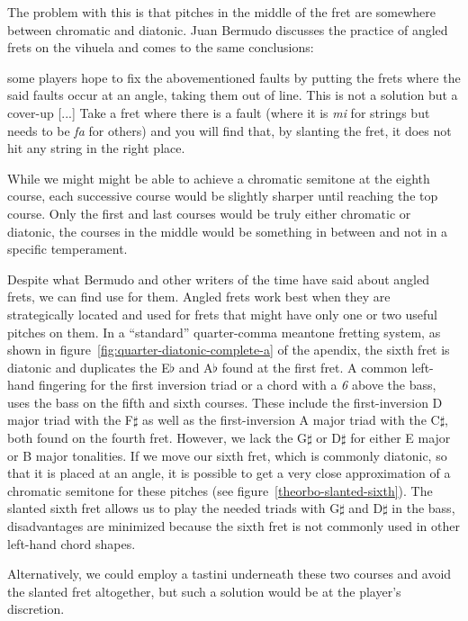 The problem with this is that pitches in the middle of the fret are somewhere between
chromatic and diatonic.  Juan Bermudo discusses the practice of angled frets on the
vihuela and comes to the same conclusions:
\begin{blocks}
[...] some players hope to fix the abovementioned faults by putting the frets where the
said faults occur at an angle, taking them out of line. This is not a solution but a
cover-up [...] Take a fret where there is a fault (where it is \textit{mi} for strings
but needs to be \textit{fa} for others) and you will find that, by slanting the fret,
it does not hit any string in the right place. \autocite[112-113]{DE:1}
\end{blocks}
While we might might be able to achieve a chromatic semitone at the eighth course, each
successive course would be slightly sharper until reaching the top course.  Only the
first and last courses would be truly either chromatic or diatonic, the courses in the
middle would be something in between and not in a specific temperament.

Despite what Bermudo and other writers of the time have said about angled frets, we can
find use for them.  Angled frets work best when they are strategically located and used
for frets that might have only one or two useful pitches on them. In a ``standard''
quarter-comma meantone fretting system, as shown in
figure~\ref{fig:quarter-diatonic-complete-a} of the apendix, the sixth fret is diatonic
and duplicates the E$\flat$ and A$\flat$ found at the first fret.  A common left-hand
fingering for the first inversion triad or a chord with a \textit{6} above the bass,
uses the bass on the fifth and sixth courses. These include the first-inversion D major
triad with the F$\sharp$ as well as the first-inversion A major triad with the
C$\sharp$, both found on the fourth fret. However, we lack the G$\sharp$ or D$\sharp$
for either E major or B major tonalities. If we move our sixth fret, which is commonly
diatonic, so that it is placed at an angle, it is possible to get a very close
approximation of a chromatic semitone for these pitches (see
figure~\ref{theorbo-slanted-sixth}).  The slanted sixth fret allows us to play the
needed triads with G$\sharp$ and D$\sharp$ in the bass, disadvantages are minimized
because the sixth fret is not commonly used in other left-hand chord shapes.

Alternatively, we could employ a tastini underneath these two courses and avoid the
slanted fret altogether, but such a solution would be at the player's discretion.


